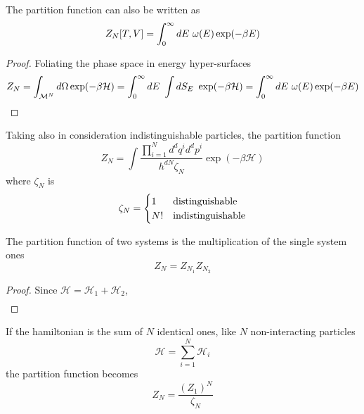     The partition function can also be written as 
    \begin{equation*}
        Z_N[T, V] = \int_{0}^{\infty}dE~ \omega(E) \exp (-\beta E)
    \end{equation*}

    \begin{proof}
        Foliating the phase space in energy hyper-surfaces 
        \begin{equation*}
            Z_N = \int_{\mathcal M^N} d\Omega \exp (- \beta \mathcal H) = \int_{0}^{\infty}dE~ \int dS_E ~ \exp (-\beta \mathcal H) = \int_{0}^{\infty}dE~ \omega(E) \exp (-\beta E)
        \end{equation*}
    \end{proof}

    Taking also in consideration indistinguishable particles, the partition function 
    \begin{equation*}
        Z_N = \int \frac{\prod_{i=1}^N d^d q^i d^d p^i}{h^{dN} \zeta_N} \exp (- \beta \mathcal H) 
    \end{equation*}
    where $\zeta_N$ is 
    \begin{equation*}
        \zeta_N = \begin{cases}
            1 & \textnormal{distinguishable} \\
            N! & \textnormal{indistinguishable}
        \end{cases}
    \end{equation*}

    The partition function of two systems is the multiplication of the single system ones
    \begin{equation}
        Z_N = Z_{N_1} Z_{N_2}
    \end{equation}

    \begin{proof}
        Since $\mathcal H = \mathcal H_1 + \mathcal H_2$, 
        \begin{equation*}
        \begin{aligned}
        \end{aligned}
        \end{equation*}
    \end{proof}

    If the hamiltonian is the sum of $N$ identical ones, like $N$ non-interacting particles
    \begin{equation*}
        \mathcal H = \sum_{i = 1}^{N} \mathcal H_i
    \end{equation*} 
    the partition function becomes 
    \begin{equation*}
        Z_N = \frac{(Z_1)^N}{\zeta_N}
    \end{equation*}

